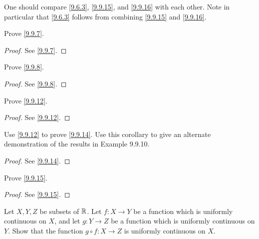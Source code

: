 \begin{rmk}\label{9.9.17}
  One should compare \cref{9.6.3}, \cref{9.9.15}, and \cref{9.9.16} with each other.
  Note in particular that \cref{9.6.3} follows from combining \cref{9.9.15} and \cref{9.9.16}.
\end{rmk}

\exercisesection

\begin{ex}\label{ex:9.9.1}
  Prove \cref{9.9.7}.
\end{ex}

\begin{proof}
  See \cref{9.9.7}.
\end{proof}

\begin{ex}\label{ex:9.9.2}
  Prove \cref{9.9.8}.
\end{ex}

\begin{proof}
  See \cref{9.9.8}.
\end{proof}

\begin{ex}\label{ex:9.9.3}
  Prove \cref{9.9.12}.
\end{ex}

\begin{proof}
  See \cref{9.9.12}.
\end{proof}

\begin{ex}\label{ex:9.9.4}
  Use \cref{9.9.12} to prove \cref{9.9.14}.
  Use this corollary to give an alternate demonstration of the results in Example 9.9.10.
\end{ex}

\begin{proof}
  See \cref{9.9.14}.
\end{proof}

\begin{ex}\label{ex:9.9.5}
  Prove \cref{9.9.15}.
\end{ex}

\begin{proof}
  See \cref{9.9.15}.
\end{proof}

\begin{ex}\label{ex:9.9.6}
  Let \(X, Y, Z\) be subsets of \(\mathbb{R}\).
  Let \(f : X \to Y\) be a function which is uniformly continuous on \(X\), and let \(g : Y \to Z\) be a function which is uniformly continuous on \(Y\).
  Show that the function \(g \circ f : X \to Z\) is uniformly continuous on \(X\).
\end{ex}

